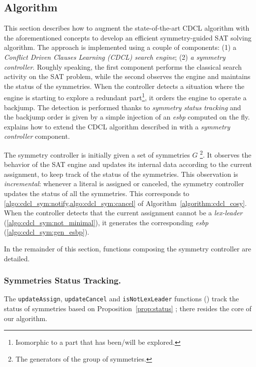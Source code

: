 \subsection{Algorithm}
This section describes how to augment the state-of-the-art CDCL algorithm with
the aforementioned concepts to develop an efficient symmetry-guided SAT
solving algorithm. 
The approach is implemented using a couple of components: (1) a
\textit{Conflict Driven Clauses Learning (CDCL) search engine}; (2) \textit{a symmetry controller}. Roughly speaking, the first component performs the
classical search activity on the SAT problem, while the second observes the
engine and maintains the status of the symmetries. When the controller detects
a situation where the engine is starting to explore a redundant
part\footnote{Isomorphic to a part that has been/will be explored.}, it orders
the engine to operate a backjump. The detection is performed thanks to
\emph{symmetry status tracking} and the backjump order is given by a simple
injection of an \emph{esbp} computed on the fly.
 explains how to extend the CDCL algorithm described in   with a \emph{symmetry controller} component.%

 
 The symmetry controller is initially given a set of symmetries $G$ \footnote{The generators of the group of symmetries.}. It observes the behavior of the SAT engine and updates its internal data according to the current assignment, to keep track of the status of the symmetries. This observation is \emph{incremental}: whenever a literal is assigned or canceled, the symmetry controller updates the status of all the symmetries. This corresponds to \cref{algo:cdcl_sym:notify,algo:cdcl_sym:cancel} of Algorithm~\ref{algorithm:cdcl_cosy}. When the controller detects that the
 current assignment cannot be a \emph{lex-leader} (\cref{algo:cdcl_sym:not_minimal}), it generates the
 corresponding \emph{esbp} (\cref{algo:cdcl_sym:gen_esbp}).
 
 \medskip\noindent In the remainder of this section, functions
 composing the symmetry controller are detailed.
 
 \subsubsection{Symmetries Status Tracking.} The \texttt{updateAssign},
 \texttt{updateCancel} and \texttt{isNot\-LexLeader} functions () track the status of symmetries based on
 Proposition~\ref{prop:status} ; there resides the core of our algorithm.
 
